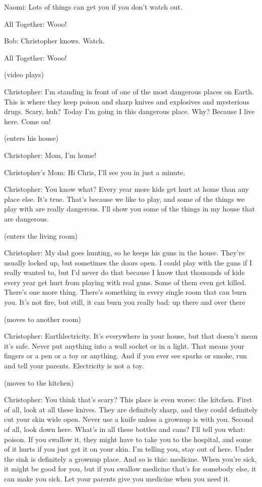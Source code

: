 Naomi: Lots of things can get you if you don't watch out.

All Together: Wooo!

Bob: Christopher knows. Watch.

All Together: Wooo!

(video plays)

Christopher: I'm standing in front of one of the most dangerous places on Earth. This is where they keep poison and sharp knives and explosives and mysterious drugs. Scary, huh? Today I'm going in this dangerous place. Why? Because I live here. Come on!

(enters his house)

Christopher: Mom, I'm home!

Christopher's Mom: Hi Chris, I'll see you in just a minute.

Christopher: You know what? Every year more kids get hurt at home than any place else. It's true. That's because we like to play, and some of the things we play with are really dangerous. I'll show you some of the things in my house that are dangerous.

(enters the living room)

Christopher: My dad goes hunting, so he keeps his guns in the house. They're usually locked up, but sometimes the doors open. I could play with the guns if I really wanted to, but I'd never do that because I know that thousands of kids every year get hurt from playing with real guns. Some of them even get killed. There's one more thing. There's something in every single room that can burn you. It's not fire, but still, it can burn you really bad: up there and over there

(moves to another room)

Christopher: Earthlectricity. It's everywhere in your house, but that doesn't mean it's safe. Never put anything into a wall socket or in a light. That means your fingers or a pen or a toy or anything. And if you ever see sparks or smoke, run and tell your parents. Electricity is not a toy.

(moves to the kitchen)

Christopher: You think that's scary? This place is even worse: the kitchen. First of all, look at all these knives. They are definitely sharp, and they could definitely cut your skin wide open. Never use a knife unless a grownup is with you. Second of all, look down here. What's in all these bottles and cans? I'll tell you what: poison. If you swallow it, they might have to take you to the hospital, and some of it hurts if you just get it on your skin. I'm telling you, stay out of here. Under the sink is definitely a grownup place. And so is this: medicine. When you're sick, it might be good for you, but if you swallow medicine that's for somebody else, it can make you sick. Let your parents give you medicine when you need it.

